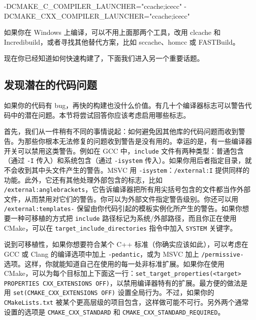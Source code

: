 \begin{codebox}[text]
-DCMAKE_C_COMPILER_LAUNCHER="ccache;icecc"  
-DCMAKE_CXX_COMPILER_LAUNCHER="ccache;icecc" 
\end{codebox}

\label{idx:651}
如果你在 Windows 上编译，可以不用上面那两个工具，改用 clcache 和 Incredibuild，或者寻找其他替代方案，比如 sccache、homcc 或 FASTBuild。

现在你已经知道如何快速构建了，下面我们进入另一个重要话题。

\subsection{发现潜在的代码问题}

\label{idx:652}
如果你的代码有 bug，再快的构建也没什么价值。有几十个编译器标志可以警告代码中的潜在问题。本节将尝试回答你应该考虑启用哪些标志。

首先，我们从一件稍有不同的事情说起：如何避免因其他库的代码问题而收到警告。为那些你根本无法修复的问题收到警告是没有用的。幸运的是，有一些编译器开关可以禁用这类警告。例如在 GCC 中，\texttt{include} 文件有两种类型：普通包含（通过 \texttt{-I} 传入）和系统包含（通过 \texttt{-isystem} 传入）。如果你用后者指定目录，就不会收到其中头文件产生的警告。MSVC 用 \texttt{-isystem}：\texttt{/\allowbreak{}external:I} 提供同样的功能。此外，它还有其他处理外部包含的标志，比如 \texttt{/\allowbreak{}external:anglebrackets}，它告诉编译器把所有用尖括号包含的文件都当作外部文件，从而禁用对它们的警告。你可以为外部文件指定警告级别。你还可以用 \texttt{/\allowbreak{}external:templates-} 保留由你代码引起的模板实例化所产生的警告。如果你想要一种可移植的方式把 \texttt{include} 路径标记为系统/外部路径，而且你正在使用 CMake，可以在 \texttt{target\_\allowbreak{}include\_\allowbreak{}directories} 指令中加入 \texttt{SYSTEM} 关键字。

说到可移植性，如果你想要符合某个 C++ 标准（你确实应该如此），可以考虑在 GCC 或 Clang 的编译选项中加上 \texttt{-pedantic}，或为 MSVC 加上 \texttt{/\allowbreak{}permissive-} 选项。这样，你就能知道自己在使用的每一处非标准扩展。如果你在使用 CMake，可以为每个目标加上下面这一行：\texttt{set\_\allowbreak{}target\_\allowbreak{}properties(\allowbreak{}<target> PROPERTIES CXX\_\allowbreak{}EXTENSIONS OFF)\allowbreak{}}，以禁用编译器特有的扩展。最方便的做法是用 \texttt{set(\allowbreak{}CMAKE\_\allowbreak{}CXX\_\allowbreak{}EXTENSIONS OFF)\allowbreak{}} 设置全局行为。不过，如果你的 \texttt{CMake\allowbreak{}Lists.\allowbreak{}txt} 被某个更高层级的项目包含，这样做可能不可行。另外两个通常设置的选项是 \texttt{CMAKE\_\allowbreak{}CXX\_\allowbreak{}STANDARD} 和 \texttt{CMAKE\_\allowbreak{}CXX\_\allowbreak{}STANDARD\_\allowbreak{}REQUIRED}。

